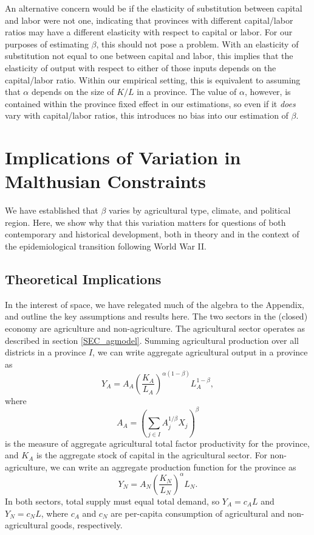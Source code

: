 \documentclass[11pt]{article}
\begin{document}
An alternative concern would be if the elasticity of substitution between capital and labor were not one, indicating that provinces with different capital/labor ratios may have a different elasticity with respect to capital or labor. For our purposes of estimating $\beta$, this should not pose a problem. With an elasticity of substitution not equal to one between capital and labor, this implies that the elasticity of output with respect to either of those inputs depends on the capital/labor ratio. Within our empirical setting, this is equivalent to assuming that $\alpha$ depends on the size of $K/L$ in a province. The value of $\alpha$, however, is contained within the province fixed effect in our estimations, so even if it \textit{does} vary with capital/labor ratios, this introduces no bias into our estimation of $\beta$.

\section{Implications of Variation in Malthusian Constraints}\label{SEC_implications}
We have established that $\beta$ varies by agricultural type, climate, and political region. Here, we show why that this variation matters for questions of both contemporary and historical development, both in theory and in the context of the epidemiological transition following World War II. 

\subsection{Theoretical Implications}\label{SEC_model}
In the interest of space, we have relegated much of the algebra to the Appendix, and outline the key assumptions and results here. The two sectors in the (closed) economy are agriculture and non-agriculture. The agricultural sector operates as described in section \ref{SEC_agmodel}. Summing agricultural production over all districts in a province $I$, we can write aggregate agricultural output in a province as
\begin{equation}
    Y_A = A_A \left(\frac{K_A}{L_A}\right)^{\alpha(1-\beta)} L_A^{1-\beta}, \label{EQ_caL_solve}
\end{equation}
where 
\begin{equation}
    A_A = \left(\sum_{j\in I} A_{j}^{1/\beta}X_{j} \right)^\beta \nonumber
\end{equation}
is the measure of aggregate agricultural total factor productivity for the province, and $K_A$ is the aggregate stock of capital in the agricultural sector. For non-agriculture, we can write an aggregate production function for the province as
\begin{equation}
    Y_N = A_N \left(\frac{K_N}{L_N}\right)^{\alpha} L_N. \label{EQ_YN}
\end{equation}
In both sectors, total supply must equal total demand, so $Y_A = c_A L$ and $Y_N = c_N L$, where $c_A$ and $c_N$ are per-capita consumption of agricultural and non-agricultural goods, respectively.
\end{document}
